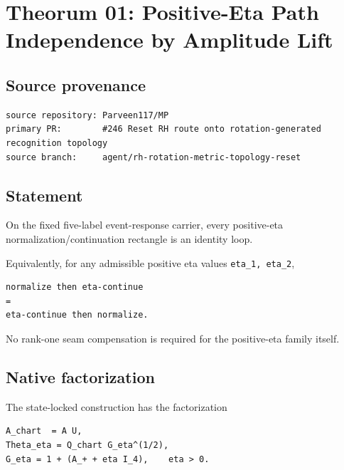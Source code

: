 \hypertarget{theorum-01-positive-eta-path-independence-by-amplitude-lift}{%
\chapter{Theorum 01: Positive-Eta Path Independence by Amplitude Lift}\label{theorum-01-positive-eta-path-independence-by-amplitude-lift}}

\hypertarget{source-provenance}{%
\section{Source provenance}\label{source-provenance}}

\begin{verbatim}
source repository: Parveen117/MP
primary PR:        #246 Reset RH route onto rotation-generated recognition topology
source branch:     agent/rh-rotation-metric-topology-reset
\end{verbatim}

\hypertarget{statement}{%
\section{Statement}\label{statement}}

On the fixed five-label event-response carrier, every positive-eta normalization/continuation rectangle is an identity loop.

Equivalently, for any admissible positive eta values \texttt{eta\_1,\ eta\_2},

\begin{verbatim}
normalize then eta-continue
=
eta-continue then normalize.
\end{verbatim}

No rank-one seam compensation is required for the positive-eta family itself.

\hypertarget{native-factorization}{%
\section{Native factorization}\label{native-factorization}}

The state-locked construction has the factorization

\begin{verbatim}
A_chart  = A U,
Theta_eta = Q_chart G_eta^(1/2),
G_eta = 1 + (A_+ + eta I_4),    eta > 0.
\end{verbatim}

